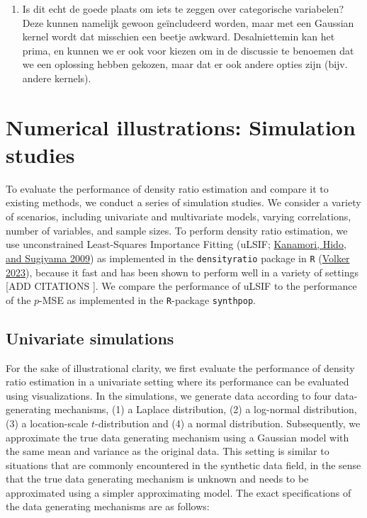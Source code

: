 \documentclass[
]{article}
\providecommand{\tightlist}{%
  \setlength{\itemsep}{0pt}\setlength{\parskip}{0pt}}\usepackage{longtable,booktabs,array}
\begin{document}
\begin{enumerate}
\def\labelenumi{\arabic{enumi}.}
\setcounter{enumi}{4}
\tightlist
\item
  Is dit echt de goede plaats om iets te zeggen over categorische
  variabelen? Deze kunnen namelijk gewoon geïncludeerd worden, maar met
  een Gaussian kernel wordt dat misschien een beetje awkward.
  Desalniettemin kan het prima, en kunnen we er ook voor kiezen om in de
  discussie te benoemen dat we een oplossing hebben gekozen, maar dat er
  ook andere opties zijn (bijv. andere kernels).
\end{enumerate}

\hypertarget{numerical-illustrations-simulation-studies}{%
\section{Numerical illustrations: Simulation
studies}\label{numerical-illustrations-simulation-studies}}

To evaluate the performance of density ratio estimation and compare it
to existing methods, we conduct a series of simulation studies. We
consider a variety of scenarios, including univariate and multivariate
models, varying correlations, number of variables, and sample sizes. To
perform density ratio estimation, we use unconstrained Least-Squares
Importance Fitting (uLSIF;
\protect\hyperlink{ref-kanamori_ulsif_2009}{Kanamori, Hido, and Sugiyama
2009}) as implemented in the \texttt{densityratio} package in \texttt{R}
(\protect\hyperlink{ref-densityratio}{Volker 2023}), because it fast and
has been shown to perform well in a variety of settings {[}ADD CITATIONS
{]}. We compare the performance of uLSIF to the performance of the
\(p\)-MSE as implemented in the \texttt{R}-package \texttt{synthpop}.

\hypertarget{univariate-simulations}{%
\subsection{Univariate simulations}\label{univariate-simulations}}

For the sake of illustrational clarity, we first evaluate the
performance of density ratio estimation in a univariate setting where
its performance can be evaluated using visualizations. In the
simulations, we generate data according to four data-generating
mechanisms, (1) a Laplace distribution, (2) a log-normal distribution,
(3) a location-scale \(t\)-distribution and (4) a normal distribution.
Subsequently, we approximate the true data generating mechanism using a
Gaussian model with the same mean and variance as the original data.
This setting is similar to situations that are commonly encountered in
the synthetic data field, in the sense that the true data generating
mechanism is unknown and needs to be approximated using a simpler
approximating model. The exact specifications of the data generating
mechanisms are as follows:
\end{document}
